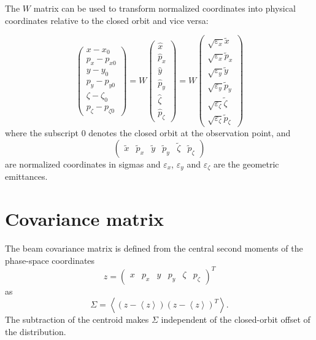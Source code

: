 The $W$ matrix can be used to transform normalized coordinates into physical
coordinates relative to the closed orbit and vice versa:

\begin{equation}
\left(\begin{array}{l}
x - x_0\\
p_x - p_{x0}\\
y - y_0\\
p_y - p_{y0}\\
\zeta - \zeta_0\\
p_\zeta - p_{\zeta0}
\end{array}\right)
=
W
\left(\begin{array}{l}
\hat{x} \\
\hat{p}_x \\
\hat{y} \\
\hat{p}_y \\
\hat{\zeta} \\
\hat{p}_\zeta
\end{array}\right)
=
W
\left(\begin{array}{l}
\sqrt{\varepsilon_x} \tilde{x} \\
\sqrt{\varepsilon_x} \tilde{p}_x \\
\sqrt{\varepsilon_y} \tilde{y} \\
\sqrt{\varepsilon_y} \tilde{p}_y \\
\sqrt{\varepsilon_\zeta} \tilde{\zeta} \\
\sqrt{\varepsilon_\zeta} \tilde{p}_\zeta
\end{array}\right)
\label{eq:norm_coord}
\end{equation}
where the subscript $0$ denotes the closed orbit at the observation point, and
\begin{equation}
\left(\begin{array}{llllll}\tilde{x} & \tilde{p}_x & \tilde{y} & \tilde{p}_y & \tilde{\zeta} & \tilde{p}_\zeta\end{array}\right)
\end{equation}
are normalized coordinates in sigmas and $\varepsilon_x$, $\varepsilon_y$ and $\varepsilon_\zeta$ are the geometric emittances.

\section{Covariance matrix}
\label{opt:sec:covariance}

The beam covariance matrix is defined from the central second moments of the
phase-space coordinates
\begin{equation}
z =
\left(\begin{array}{llllll}
x & p_x & y & p_y & \zeta & p_\zeta
\end{array}\right)^T
\end{equation}
as
\begin{equation}
\Sigma = \left<\left(z-\left<z\right>\right)
\left(z-\left<z\right>\right)^T\right>.
\label{eq:covariance_definition}
\end{equation}
The subtraction of the centroid makes $\Sigma$ independent of the closed-orbit
offset of the distribution.

